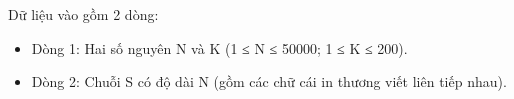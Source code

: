 Dữ liệu vào gồm 2 dòng:  
\begin{itemize}
	\item     Dòng 1: Hai số nguyên N và K (1 ≤ N ≤ 50000; 1 ≤ K ≤ 200).   
	\item     Dòng 2: Chuỗi S có độ dài N (gồm các chữ cái in thương viết liên tiếp nhau).   
\end{itemize}